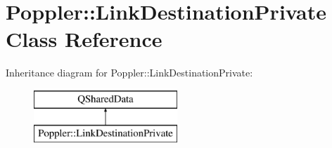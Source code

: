\hypertarget{class_poppler_1_1_link_destination_private}{}\section{Poppler\+:\+:Link\+Destination\+Private Class Reference}
\label{class_poppler_1_1_link_destination_private}
Inheritance diagram for Poppler\+:\+:Link\+Destination\+Private\+:\begin{figure}[H]
\begin{center}
\leavevmode
\includegraphics[height=2.000000cm]{class_poppler_1_1_link_destination_private}
\end{center}
\end{figure}
